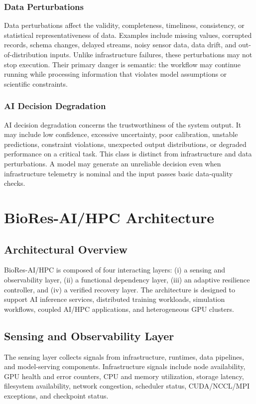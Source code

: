 \documentclass[conference]{IEEEtran}
\begin{document}
\subsubsection{Data Perturbations}
Data perturbations affect the validity, completeness, timeliness, consistency, or statistical representativeness of data. Examples include missing values, corrupted records, schema changes, delayed streams, noisy sensor data, data drift, and out-of-distribution inputs. Unlike infrastructure failures, these perturbations may not stop execution. Their primary danger is semantic: the workflow may continue running while processing information that violates model assumptions or scientific constraints.

\subsubsection{AI Decision Degradation}
AI decision degradation concerns the trustworthiness of the system output. It may include low confidence, excessive uncertainty, poor calibration, unstable predictions, constraint violations, unexpected output distributions, or degraded performance on a critical task. This class is distinct from infrastructure and data perturbations. A model may generate an unreliable decision even when infrastructure telemetry is nominal and the input passes basic data-quality checks.

\section{BioRes-AI/HPC Architecture}

\subsection{Architectural Overview}

BioRes-AI/HPC is composed of four interacting layers: (i) a sensing and observability layer, (ii) a functional dependency layer, (iii) an adaptive resilience controller, and (iv) a verified recovery layer. The architecture is designed to support AI inference services, distributed training workloads, simulation workflows, coupled AI/HPC applications, and heterogeneous GPU clusters.

\subsection{Sensing and Observability Layer}

The sensing layer collects signals from infrastructure, runtimes, data pipelines, and model-serving components. Infrastructure signals include node availability, GPU health and error counters, CPU and memory utilization, storage latency, filesystem availability, network congestion, scheduler status, CUDA/NCCL/MPI exceptions, and checkpoint status.
\end{document}
